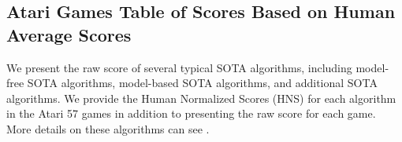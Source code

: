 \def\LBCHmedianhns{1665.60}
\def\LBCHmedianhnsle{5.73E-08 }

\def\LBCHHWRB{24 }
\def\LBCHHWRBle{1.10E-07 }


\def\LBCHmeanHWRNS{154.27}
\def\LBCHmeanHWRNSle{7.71E-09 }


\def\LBCHmedianHWRNS{50.63}
\def\LBCHmedianHWRNSle{2.53E-09 }


\def\LBCHmeanSABER{71.26}
\def\LBCHmeanSABERle{3.56E-09 }


\def\LBCHmedianSABER{50.63}
\def\LBCHmedianSABERle{2.53E-09 }

\def\LBCHnumframes{1.00E+09 }
\def\LBCHgametime{192.5 }


\def\mememeanhns{4081.14}

\def\mememedianhns{1225.19}

\def\memeHWRB{24 }
\def\memeHWRBle{1.10E-07 }


\def\mememeanHWRNS{154.27}
\def\mememeanHWRNSle{7.71E-09 }


\def\mememedianHWRNS{50.63}
\def\mememedianHWRNSle{2.53E-09 }


\def\mememeanSABER{71.26}
\def\mememeanSABERle{3.56E-09 }


\def\mememedianSABER{50.63}
\def\mememedianSABERle{2.53E-09 }

\def\memenumframes{1.00E+09 }
\def\memegametime{192.5 }


\subsection{Atari Games Table of Scores Based on Human Average Scores}
\label{app: Atari Games Table of Scores Based on Human Average Records}
We present the raw score of several typical SOTA algorithms, including model-free SOTA algorithms, model-based SOTA algorithms, and additional SOTA algorithms. We provide the Human Normalized Scores (HNS) for each algorithm in the Atari 57 games in addition to presenting the raw score for each game. More details on these algorithms can see \cite{ale2,atarihuman,atari_review}.

\clearpage


